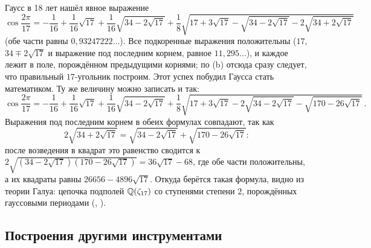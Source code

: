 Гаусс в 18 лет нашёл явное выражение
\[
\cos\frac{2\pi}{17}=-\frac1{16}+\frac1{16}\sqrt{17}+\frac1{16}\sqrt{34-2\sqrt{17}}
+\frac18\sqrt{17+3\sqrt{17}-\sqrt{34-2\sqrt{17}}-2\sqrt{34+2\sqrt{17}}}
\]
(обе части равны $0{,}93247222\ldots$). Все подкоренные выражения положительны ($17$, $34\mp2\sqrt{17}$ и выражение
под последним корнем, равное $11{,}295\ldots$), и каждое лежит в поле, порождённом предыдущими корнями; по
(b) отсюда сразу следует, что правильный $17$-угольник построим. Этот успех побудил Гаусса стать
математиком. Ту же величину можно записать и так:
\[
\cos\frac{2\pi}{17}=-\frac1{16}+\frac1{16}\sqrt{17}+\frac1{16}\sqrt{34-2\sqrt{17}}
+\frac18\sqrt{17+3\sqrt{17}-2\sqrt{34-2\sqrt{17}}-\sqrt{170-26\sqrt{17}}}\,.
\]
Выражения под последним корнем в обеих формулах совпадают, так как
\[
2\sqrt{34+2\sqrt{17}}=\sqrt{34-2\sqrt{17}}+\sqrt{170-26\sqrt{17}}:
\]
после возведения в квадрат это равенство сводится к $2\sqrt{(34-2\sqrt{17})(170-26\sqrt{17})}=36\sqrt{17}-68$, где обе
части положительны, а их квадраты равны $26656-4896\sqrt{17}$. Откуда берётся такая формула, видно из теории Галуа: цепочка подполей
$\mathbb Q(\zeta_{17})$ со ступенями степени $2$, порождённых гауссовыми периодами (, ).

\subsection*{Построения другими инструментами}

